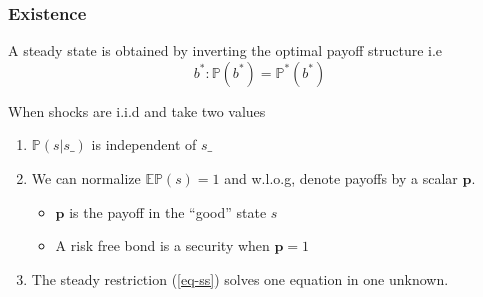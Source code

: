 \documentclass{beamer}
\begin{document}
 \begin{frame}
  \frametitle{Existence}
 A steady state is obtained by inverting the optimal payoff structure i.e 
\begin{equation}
\label{eq-ss}
b^*: \mathbb{P}(b^*)=\mathbb{P}^*(b^*)
\end{equation}

 
 When shocks are i.i.d and take two values
 
  \begin{enumerate}
 
\item $\mathbb{P}(s|s\_)$ is independent of $s\_$ 
\item We can normalize $\mathbb{E}\mathbb{P}(s)=1$ and w.l.o.g, denote payoffs by a scalar $\bm{p}$.
\begin{itemize}
 \item $\bm{p}$ is the payoff in the ``good'' state $s$
 \item A risk free bond is a security when $\bm{p}=1$
\end{itemize}
\item  The steady restriction (\ref{eq-ss}) solves one equation in one unknown.  
\end{enumerate}
\end{frame}
\end{document}
